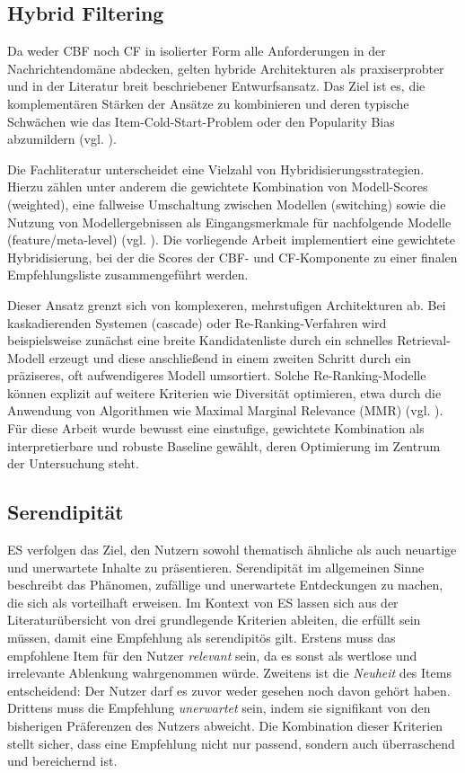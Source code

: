 \subsection{Hybrid Filtering}
\label{sec:hybrid}
Da weder \ac{CBF} noch \ac{CF} in isolierter Form alle Anforderungen in der Nachrichtendomäne abdecken, 
gelten hybride Architekturen als praxiserprobter und in der Literatur breit beschriebener Entwurfsansatz. 
Das Ziel ist es, die komplementären Stärken der Ansätze zu kombinieren und deren typische Schwächen 
wie das Item-Cold-Start-Problem oder den Popularity Bias abzumildern 
(vgl. \cite{burke_hybrid_2002,wu_personalized_2022,raza_news_2020}).

Die Fachliteratur unterscheidet eine Vielzahl von Hybridisierungsstrategien. Hierzu zählen unter anderem 
die gewichtete Kombination von Modell-Scores (weighted), eine fallweise Umschaltung zwischen Modellen 
(switching) sowie die Nutzung von Modellergebnissen als Eingangsmerkmale für nachfolgende Modelle 
(feature/meta-level) (vgl. \cite{burke_hybrid_2002}). 
Die vorliegende Arbeit implementiert eine gewichtete Hybridisierung, bei der die Scores der 
\ac{CBF}- und \ac{CF}-Komponente zu einer finalen Empfehlungsliste zusammengeführt werden.

Dieser Ansatz grenzt sich von komplexeren, mehrstufigen Architekturen ab. Bei kaskadierenden 
Systemen (cascade) oder Re-Ranking-Verfahren wird beispielsweise zunächst eine breite Kandidatenliste 
durch ein schnelles Retrieval-Modell erzeugt und diese anschließend in einem zweiten Schritt durch 
ein präziseres, oft aufwendigeres Modell umsortiert. Solche Re-Ranking-Modelle können explizit auf 
weitere Kriterien wie Diversität optimieren, etwa durch die Anwendung von Algorithmen wie 
Maximal Marginal Relevance (MMR) (vgl. \cite{Carbonell_mmr_1998}). Für diese Arbeit wurde bewusst 
eine einstufige, gewichtete Kombination als interpretierbare und robuste Baseline gewählt, deren 
Optimierung im Zentrum der Untersuchung steht.

\subsection{Serendipität}
\label{sec:serendipitaet}
\ac{ES} verfolgen das Ziel, den Nutzern sowohl thematisch ähnliche als auch neuartige und 
unerwartete Inhalte zu präsentieren. Serendipität im allgemeinen Sinne beschreibt das Phänomen, 
zufällige und unerwartete Entdeckungen zu machen, die sich als vorteilhaft erweisen. Im Kontext von \ac{ES} 
lassen sich aus der Literaturübersicht von \cite{Kotkov_Serendipity_2016} drei grundlegende Kriterien ableiten, 
die erfüllt sein müssen, damit eine Empfehlung als serendipitös gilt. Erstens muss das empfohlene Item für den Nutzer 
\textit{relevant} sein, da es sonst als wertlose und irrelevante Ablenkung wahrgenommen würde. Zweitens ist die 
\textit{Neuheit} des Items entscheidend: Der Nutzer darf es zuvor weder gesehen noch davon gehört haben. 
Drittens muss die Empfehlung \textit{unerwartet} sein, indem sie signifikant von den bisherigen Präferenzen des 
Nutzers abweicht. Die Kombination dieser Kriterien stellt sicher, dass eine Empfehlung nicht nur passend, 
sondern auch überraschend und bereichernd ist.

